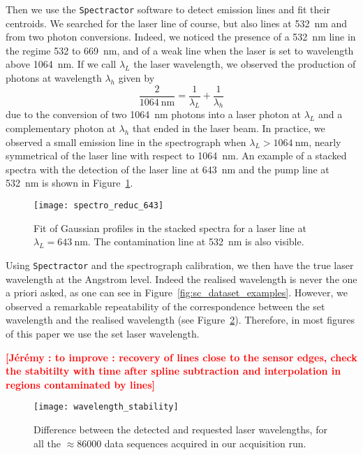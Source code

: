 \documentclass[printer]{aa}
\newcommand{\todo}[1]{\textbf{\textcolor{red}{[#1]}}\xspace}
\begin{document}
Then we use the \texttt{Spectractor} software to detect emission lines and fit their centroids. We searched for the laser line of course, but also lines at \SI{532}{\nm} and from two photon conversions. Indeed, we noticed the presence of a \SI{532}{\nm} line in the regime 532 to \SI{669}{\nm}, and of a weak line when the laser is set to wavelength above \SI{1064}{\nm}. If we call $\lambda_L$ the laser wavelength, we observed the production of photons at wavelength $\lambda_h$ given by
\begin{equation}
 \frac{2}{\SI{1064}{\nm}} = \frac{1}{\lambda_L} + \frac{1}{\lambda_h}
 \end{equation} 
due to the conversion of two \SI{1064}{\nm} photons into a laser photon at $\lambda_L$ and a complementary photon at $\lambda_h$ that ended in the laser beam. In practice, we observed a small emission line in the spectrograph when $\lambda_L > \SI{1064}{\nm}$, nearly symmetrical of the laser line with respect to \SI{1064}{\nm}. An example of a stacked spectra with the detection of the laser line at \SI{643}{\nm} and the pump line at \SI{532}{\nm} is shown in Figure~\ref{fig:spectro_reduc_643}.




\begin{figure}[!h]
\centering
\texttt{[image: spectro\_reduc\_643]}
\caption{Fit of Gaussian profiles in the stacked spectra for a laser line at $\lambda_L=\SI{643}{\nm}$. The contamination line at \SI{532}{nm} is also visible.}\label{fig:spectro_reduc_643}
\end{figure}


Using \texttt{Spectractor} and the spectrograph calibration, we then have the true laser wavelength at the Angstrom level. Indeed the realised wavelength is never the one a priori asked, as one can see in Figure~\ref{fig:sc_dataset_examples}. However, we observed a remarkable repeatability of the correspondence between the set wavelength and the realised wavelength (see Figure~\ref{fig:wavelength_stability}). Therefore, in most figures of this paper we use the set laser wavelength. 

\todo{Jérémy : to improve : recovery of lines close to the sensor edges, check the stabitilty with time after spline subtraction and interpolation in regions contaminated by lines}




\begin{figure}[!h]
\centering
\texttt{[image: wavelength\_stability]}
\caption{Difference between the detected and requested laser wavelengths, for all the $\approx 86000$ data sequences acquired in our acquisition run.}\label{fig:wavelength_stability}
\end{figure}
\end{document}

